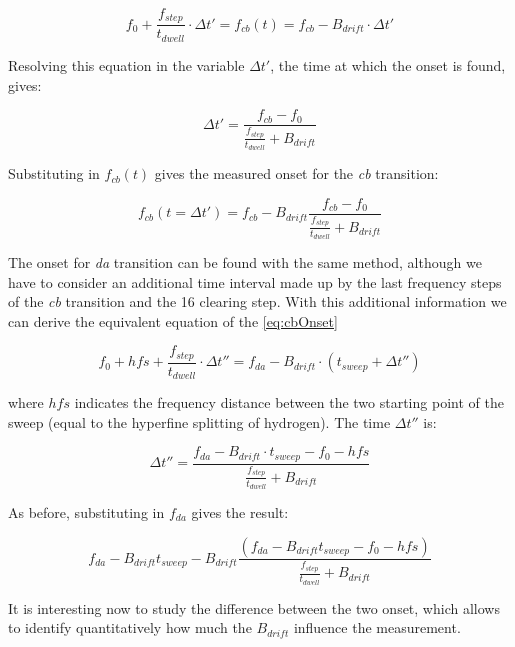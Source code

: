 \documentclass[11pt,a4paper,oneside]{article}
\begin{document}
\begin{equation} \label{eq:cbOnset}
f_{0} + \dfrac{f_{step}}{t_{dwell}} \cdot \Delta t' = f_{cb}(t) = f_{cb} - B_{drift} \cdot \Delta t'
\end{equation}

Resolving this equation in the variable $\Delta t'$, the time at which the onset is found, gives:

\begin{equation}
\Delta t' = \dfrac{f_{cb} - f_{0}}{ \frac{f_{step}}{t_{dwell}} + B_{drift}}
\end{equation}

Substituting in $f_{cb}(t)$ gives the measured onset for the \textit{cb} transition:

\begin{equation}
f_{cb}(t = \Delta t') = f_{cb} - B_{drift} \dfrac{f_{cb} - f_{0}}{ \frac{f_{step}}{t_{dwell}} + B_{drift}}
\end{equation} 

The onset for \textit{da} transition can be found with the same method, although we have to consider an additional time interval made up by the last frequency steps of the \textit{cb} transition and the 16 clearing step. With this additional information we can derive the equivalent equation of the \ref{eq:cbOnset}

\begin{equation}
f_{0} + hfs +  \dfrac{f_{step}}{t_{dwell}} \cdot \Delta t'' = f_{da} -B_{drift} \cdot (t_{sweep} + \Delta t'') 
\end{equation}

where $hfs$ indicates the frequency distance between the two starting point of the sweep (equal to the hyperfine splitting of hydrogen). The time $\Delta t''$ is:

\begin{equation}
\Delta t'' = \dfrac{f_{da} - B_{drift} \cdot t_{sweep} - f_{0} - hfs}{ \frac{f_{step}}{t_{dwell}} + B_{drift}}
\end{equation} 

As before, substituting in $f_{da}$ gives the result:

\begin{equation}
f_{da} - B_{drift} t_{sweep} - B_{drift} \dfrac{( f_{da} - B_{drift} t_{sweep} - f_{0} - hfs)}{ \frac{f_{step}}{t_{dwell}} + B_{drift}}
\end{equation}

It is interesting now to study the difference between the two onset, which allows to identify quantitatively how much the $B_{drift}$ influence the measurement. 
\end{document}
